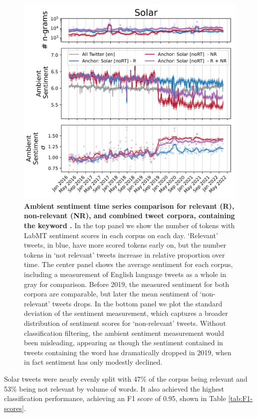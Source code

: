 \begin{figure}[tp!]
  \centering	
    \includegraphics[width=0.98\columnwidth]{figures/Solar_sentiment_2016-01-01_2022-03-15.png}  
  \caption{
    \textbf{Ambient sentiment time series comparison for relevant  (R), non-relevant (NR), and combined tweet corpora, containing the keyword .}
    In the top panel we show the number of tokens with LabMT \cite{dodds2015human} sentiment scores in each corpus on each day.
    `Relevant' tweets, in blue, have more scored tokens early on,
    but the number tokens in `not relevant' tweets increase in relative proportion over time.
    The center panel shows the average sentiment for each corpus, including a measurement of English language tweets as a whole in gray for comparison. 
    Before 2019, the measured sentiment for both corpora are comparable, but later the mean sentiment of `non-relevant' tweets drops. 
    In the bottom panel we plot the standard deviation of the sentiment measurement, which captures a broader distribution of sentiment scores for  `non-relevant' tweets.
    Without classification filtering, the ambient sentiment measurement would been misleading, appearing as though the sentiment contained in tweets containing the word  has dramatically dropped in 2019, when in fact sentiment has only modestly declined. 
  }
  \label{fig:solar_sentiment}
\end{figure}


Solar tweets were nearly evenly split with 47\% of the corpus being relevant and 53\% being not relevant by volume of words.
It also achieved the highest classification performance, achieving an F1 score of 0.95, shown in Table \ref{tab:F1-scores}.



